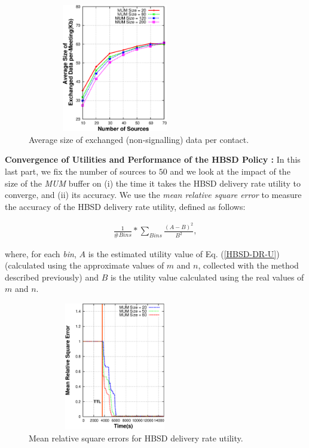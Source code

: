 \begin{figure}[!h]
\centering
\includegraphics[width=3in,height=2.2in]{Chapitre3/fig8.eps}
\caption{Average size of exchanged (non-signalling) data per contact.}
\label{PMED}
\end{figure}

\textbf{Convergence of Utilities and Performance of the HBSD Policy :} In this last part, we fix the number of sources to $50$ and we look at the impact of the size of the \emph{MUM} buffer on (i) the time it takes the HBSD delivery rate utility to converge, and (ii) its accuracy. We use the \emph{mean relative square error} to measure the accuracy of the HBSD delivery rate utility, defined as follows:

\begin{eqnarray*}
\frac{1}{\# Bins}* \sum_{Bins}^{}\frac{(A-B)^2}{B^2},
\end{eqnarray*}

where, for each \emph{bin}, $A$ is the estimated utility value of Eq. (\ref{HBSD-DR-U}) (calculated using the approximate values of $m$ and $n$, collected with the method described previously) and $B$ is the utility value calculated using the real values of $m$ and $n$.

\begin{figure}[!h]
\centering
\includegraphics[width=3in,height=2.2in]{Chapitre3/fig9.eps}
\caption{Mean relative square errors for HBSD delivery rate utility.}
\label{DR-RE}
\end{figure}


